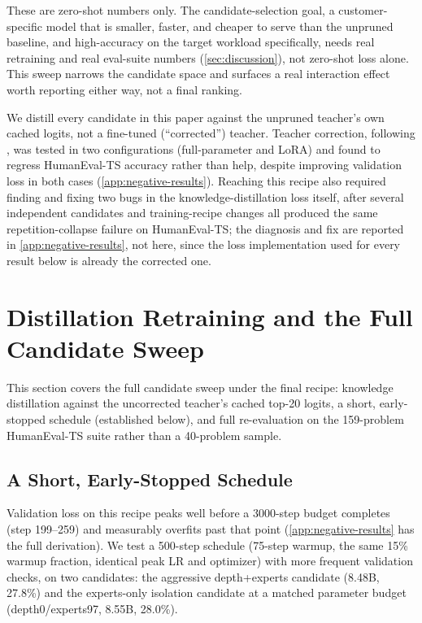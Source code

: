 \documentclass{article}
\theoremstyle{plain}
\theoremstyle{definition}
\theoremstyle{remark}
\begin{document}
These are zero-shot numbers only. The candidate-selection goal, a
customer-specific model that is smaller, faster, and cheaper to
serve than the unpruned baseline, and high-accuracy on the target
workload specifically, needs real retraining and real eval-suite numbers
(\cref{sec:discussion}), not zero-shot loss alone. This sweep narrows the
candidate space and surfaces a real interaction effect worth reporting
either way, not a final ranking.


We distill every candidate in this paper against the unpruned teacher's
own cached logits, not a fine-tuned (``corrected'') teacher. Teacher
correction, following \citet{minitron2024practice}, was tested in two
configurations (full-parameter and LoRA) and found to regress
HumanEval-TS accuracy rather than help, despite improving validation
loss in both cases (\cref{app:negative-results}). Reaching this recipe
also required finding and fixing two bugs in the knowledge-distillation
loss itself, after several independent candidates and training-recipe
changes all produced the same repetition-collapse failure on
HumanEval-TS; the diagnosis and fix are reported in
\cref{app:negative-results}, not here, since the loss implementation
used for every result below is already the corrected one.

\section{Distillation Retraining and the Full Candidate Sweep}
\label{sec:phase4-full-sweep}

This section covers the full candidate sweep under the final recipe:
knowledge distillation against the uncorrected teacher's cached top-20
logits, a short, early-stopped schedule (established below), and full
re-evaluation on the 159-problem HumanEval-TS suite rather than a
40-problem sample.

\subsection{A Short, Early-Stopped Schedule}
\label{sec:phase4-short-schedule}

Validation loss on this recipe peaks well before a 3000-step budget
completes (step 199--259) and measurably overfits past that point
(\cref{app:negative-results} has the full derivation). We test a
500-step schedule (75-step warmup, the same 15\% warmup fraction,
identical peak LR and optimizer) with more frequent validation checks,
on two candidates: the aggressive depth+experts candidate (8.48B,
27.8\%) and the experts-only isolation candidate at a matched parameter
budget (depth0/experts97, 8.55B, 28.0\%).
\end{document}
